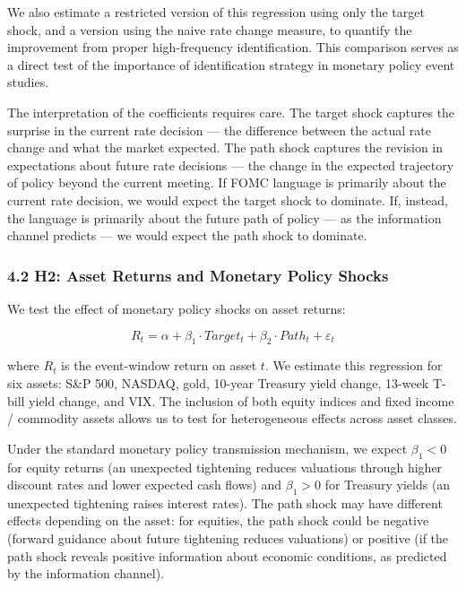 \documentclass[12pt]{article}
\begin{document}
We also estimate a restricted version of this regression using only the
target shock, and a version using the naive rate change measure, to
quantify the improvement from proper high-frequency identification. This
comparison serves as a direct test of the importance of identification
strategy in monetary policy event studies.

The interpretation of the coefficients requires care. The target shock
captures the surprise in the current rate decision --- the difference
between the actual rate change and what the market expected. The path
shock captures the revision in expectations about future rate decisions
--- the change in the expected trajectory of policy beyond the current
meeting. If FOMC language is primarily about the current rate decision,
we would expect the target shock to dominate. If, instead, the language
is primarily about the future path of policy --- as the information
channel predicts --- we would expect the path shock to dominate.

\subsubsection{4.2 H2: Asset Returns and Monetary Policy
Shocks}\label{h2-asset-returns-and-monetary-policy-shocks}

We test the effect of monetary policy shocks on asset returns:

\[R_t = \alpha + \beta_1 \cdot Target_t + \beta_2 \cdot Path_t + \varepsilon_t\]

where \(R_t\) is the event-window return on asset \(t\). We estimate
this regression for six assets: S\&P 500, NASDAQ, gold, 10-year Treasury
yield change, 13-week T-bill yield change, and VIX. The inclusion of
both equity indices and fixed income / commodity assets allows us to
test for heterogeneous effects across asset classes.

Under the standard monetary policy transmission mechanism, we expect
\(\beta_1 < 0\) for equity returns (an unexpected tightening reduces
valuations through higher discount rates and lower expected cash flows)
and \(\beta_1 > 0\) for Treasury yields (an unexpected tightening raises
interest rates). The path shock may have different effects depending on
the asset: for equities, the path shock could be negative (forward
guidance about future tightening reduces valuations) or positive (if the
path shock reveals positive information about economic conditions, as
predicted by the information channel).
\end{document}
